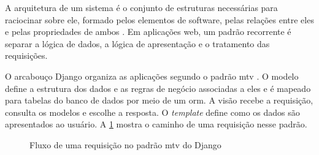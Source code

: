 A arquitetura de um sistema é o conjunto de estruturas necessárias para
raciocinar sobre ele, formado pelos elementos de software, pelas relações
entre eles e pelas propriedades de ambos \cite{bass2021software}. Em
aplicações web, um padrão recorrente é separar a lógica de dados, a lógica de
apresentação e o tratamento das requisições.

O arcabouço Django organiza as aplicações segundo o padrão \ac{mtv}
\cite{django2026documentation}. O modelo define a estrutura dos dados e as
regras de negócio associadas a eles e é mapeado para tabelas do banco de dados
por meio de um \ac{orm}. A visão recebe a requisição, consulta os modelos e
escolhe a resposta. O \emph{template} define como os dados são apresentados
ao usuário. A \cref{fig:mtv} mostra o caminho de uma requisição nesse padrão.

\begin{figure}[htbp]
  \centering
  \caption{Fluxo de uma requisição no padrão \acs{mtv} do Django}
  \label{fig:mtv}
\end{figure}

